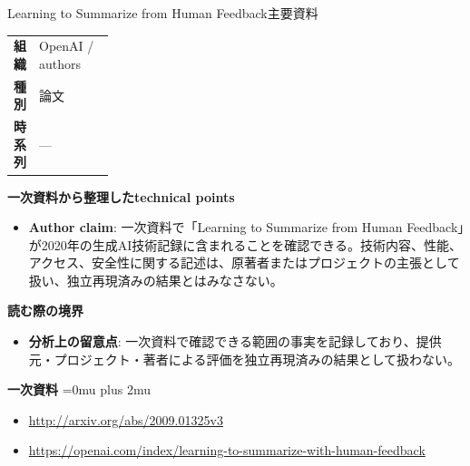 \begin{technicalnote}{Learning to Summarize from Human Feedback}{主要資料}
\begingroup
\begin{tabularx}{\linewidth}{@{}>{\bfseries}p{0.22\linewidth}X@{}}
組織 & OpenAI / authors \\
種別 & 論文 \\
時系列 & — \\
\end{tabularx}
\smallskip
{\bfseries 一次資料から整理したtechnical points}
\begin{itemize}[leftmargin=1.5em,itemsep=0.35em]
\item \textbf{Author claim}: 一次資料で「Learning to Summarize from Human Feedback」が2020年の生成AI技術記録に含まれることを確認できる。技術内容、性能、アクセス、安全性に関する記述は、原著者またはプロジェクトの主張として扱い、独立再現済みの結果とはみなさない。
\end{itemize}
\begin{minipage}{\linewidth}
{\bfseries 読む際の境界}
\begin{itemize}[leftmargin=1.5em,itemsep=0.35em]
\item \textbf{分析上の留意点}: 一次資料で確認できる範囲の事実を記録しており、提供元・プロジェクト・著者による評価を独立再現済みの結果として扱わない。
\end{itemize}
\begin{samepage}
{\bfseries 一次資料}
\begingroup\sloppy
\Urlmuskip=0mu plus 2mu\relax
\begin{itemize}[leftmargin=1.5em,itemsep=0.25em]
\item {\scriptsize\url{http://arxiv.org/abs/2009.01325v3}}
\item {\scriptsize\url{https://openai.com/index/learning-to-summarize-with-human-feedback}}
\end{itemize}
\endgroup
\end{samepage}
\end{minipage}
\endgroup
\end{technicalnote}
\medskip
